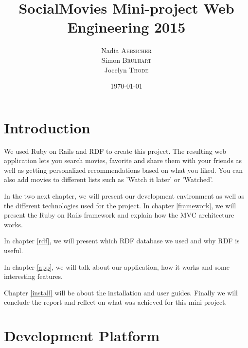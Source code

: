 \documentclass[12pt,a4paper]{article}
\begin{document}
\sloppy
\renewcommand{\thepage}{}
\pagestyle{empty}

\title{SocialMovies Mini-project  Web Engineering 2015}
\date{\today}
\author{Nadia \textsc{Aebsicher} \\ Simon \textsc{Brulhart} \\Jocelyn \textsc{Thode}\\}

\graphicspath{{figures/}}

\maketitle

\pagestyle{plain}
\tableofcontents
\newpage

\pagestyle{headings}



\section{Introduction}

We used Ruby on Rails and RDF to create this project. The resulting web application lets you search movies, favorite and share them with your friends as well as getting personalized recommendations based on what you liked. You can also add movies to different lists such as 'Watch it later' or 'Watched'.

In the two next chapter, we will present our development environment as well as the different technologies used for the project. In chapter \ref{framework}, we will present the Ruby on Rails framework and explain how the MVC architecture works.

In chapter \ref{rdf}, we will present which RDF database we used and why RDF is useful.

In chapter \ref{app}, we will talk about our application, how it works and some interesting features.

Chapter \ref{install} will be about the installation and user guides. Finally we will conclude the report and reflect on what was achieved for this mini-project.

\section{Development Platform}\label{dev_plat}
\end{document}
